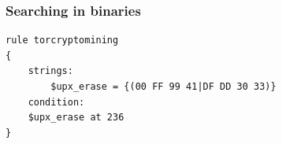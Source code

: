 \documentclass{beamer}
\begin{document}
\lstset{language=Python}
\begin{frame}[fragile]
\frametitle{Searching in binaries}
	\begin{lstlisting}
rule torcryptomining
{
    strings:
        $upx_erase = {(00 FF 99 41|DF DD 30 33)}
    condition:
	$upx_erase at 236
}
	\end{lstlisting}
\end{frame}
\end{document}
